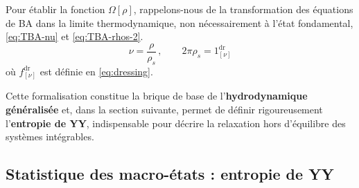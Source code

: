 
\medskip

Pour établir la fonction $\Omega[\rho]$, rappelons-nous de la transformation des équations de \gls{BA} dans la limite thermodynamique, non nécessairement à l'état fondamental, \eqref{eq:TBA-nu} et \eqref{eq:TBA-rhos-2}.
\begin{equation}
	\nu = \frac{\rho}{\rho_s} \, , \qquad 2\pi \rho_s = 1^{\mathrm{dr}}_{[\nu]} 
\label{chap.2:eq:TBA-rhos}
\end{equation}
où $f^{\mathrm{dr}}_{[\nu]}$ est définie en \eqref{eq:dressing}.

\medskip

Cette formalisation constitue la brique de base de l'\textbf{hydrodynamique généralisée} et, dans la section suivante, permet de définir rigoureusement l’\textbf{entropie de \gls{YY}}, indispensable pour décrire la relaxation hors d’équilibre des systèmes intégrables.


%



\subsection{Statistique des macro-états : entropie de \acrlong{YY}}


